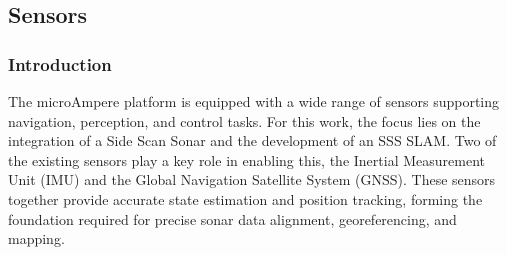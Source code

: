 \subsection{Sensors}
\subsubsection{Introduction}
The microAmpere platform is equipped with a wide range of sensors supporting navigation, perception, and control tasks. For this work, the focus lies on the integration of a Side Scan Sonar and the development of an SSS SLAM. Two of the existing sensors play a key role in enabling this, the Inertial Measurement Unit (IMU) and the Global Navigation Satellite System (GNSS). These sensors together provide accurate state estimation and position tracking, forming the foundation required for precise sonar data alignment, georeferencing, and mapping.




